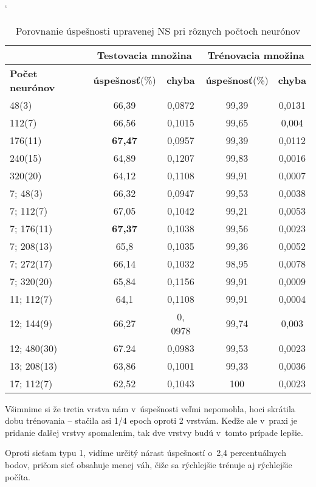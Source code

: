 \begin{table}[htp]
\catcode` %
\centering
\begin{tabular}{|l|c|c|c|c|}
\cline{2-5}
\multicolumn{1}{l}{} & \multicolumn{2}{|c|}{\textbf{Testovacia množina}} & \multicolumn{2}{c|}{\textbf{Trénovacia množina}}\\ 
\hline
\textbf{Počet neurónov} & \textbf{úspešnosť}(\%) & \textbf{chyba} & \textbf{úspešnosť}(\%) & \textbf{chyba} \\ \hline
48(3)& 66,39 & 0,0872 & 99,39 & 0,0131 \\ \hline
112(7)& 66,56 & 0,1015 & 99,65 & 0,004 \\ \hline 
176(11)& \textbf{67,47} & 0,0957 & 99,39 & 0,0112 \\ \hline
240(15)& 64,89 & 0,1207 & 99,83 & 0,0016 \\ \hline
320(20)& 64,12 & 0,1108 & 99,91 & 0,0007 \\ \hline
7; 48(3)& 66,32 & 0,0947 & 99,53 & 0,0038 \\ \hline 
7; 112(7)& 67,05 & 0,1042 & 99,21 & 0,0053 \\ \hline 
7; 176(11)& \textbf{67,37} & 0,1038 & 99,56 & 0,0023 \\ \hline
7; 208(13)& 65,8  & 0,1035 & 99,36 & 0,0052 \\ \hline 
7; 272(17)& 66,14 & 0,1032 & 98,95 & 0,0078 \\ \hline 
7; 320(20)& 65,84& 0,1156 & 99,91 & 0,0009\\ \hline 
11; 112(7)& 64,1 & 0,1108 & 99,91 & 0,0004 \\ \hline
12; 144(9)& 66,27 & 0, 0978 & 99,74 & 0,003 \\ \hline
12; 480(30)& 67.24 & 0,0983 & 99,53 & 0,0023 \\ \hline 
13; 208(13)& 63,86 & 0,1001 & 99,33 & 0,0036 \\ \hline 
17; 112(7)& 62,52 & 0,1043 & 100 & 0,0023 \\ \hline
\end{tabular}
\caption{Porovnanie úspešnosti upravenej NS pri rôznych počtoch neurónov}
\label{tab:neuroncountcmp2}
\end{table}

Všimnime si že tretia vrstva nám v~úspešnosti veľmi nepomohla, hoci skrátila dobu trénovania -- stačila asi 1/4 epoch oproti 2 vrstvám. Keďže ale v~praxi je pridanie ďalšej vrstvy spomalením, tak dve vrstvy budú v~tomto prípade lepšie.

Oproti sieťam typu 1, vidíme určitý nárast úspešností o~2,4 percentuálnych bodov, pričom sieť obsahuje menej váh, čiže sa rýchlejšie trénuje aj rýchlejšie počíta.

